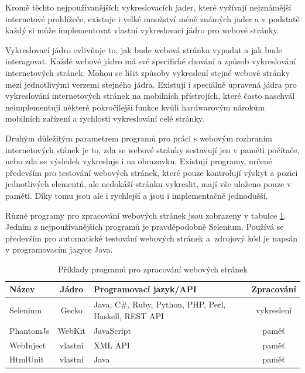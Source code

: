 \documentclass[thesis=M,czech]{FITthesis}[2013/05/10]
\begin{document}
Kromě těchto nejpoužívanějších vykreslovacích jader, které vyžívají nejznámější internetové prohlížeče, existuje i velké množství méně známých jader a v podstatě každý si může implementovat vlastní vykreslovací jádro pro webové stránky.

Vykreslovací jádro ovlivňuje to, jak bude webová stránka vypadat a jak bude interagovat. Každé webové jádro má své specifické chování a způsob vykreslování internetových stránek. Mohou se lišit způsoby vykreslení stejné webové stránky mezi jednotlivými verzemi stejného jádra. Existují i speciálně upravená jádra pro vykreslování internetových stránek na mobilních přístrojích, které často naschvál neimplementují některé pokročilejší funkce kvůli hardwarovým nárokům mobilních zařízení a rychlosti vykreslování celé stránky.

Druhým důležitým parametrem programů pro práci s webovým rozhraním internetových stánek je to, zda se webové stránky sestavují jen v paměti počítače, nebo zda se výsledek vykresluje i na obrazovku. Existují programy, určené především pro testování webových stránek, které pouze kontrolují výskyt a pozici jednotlivých elementů, ale nedokáží stránku vykreslit, mají vše uloženo pouze v paměti. Díky tomu jsou ale i rychlejší a jsou i implementačně jednodušší. 

Různé programy pro zpracování webových stránek jsou zobrazeny v tabulce \ref{tab:web-engines}. Jedním z nejpoužívanějších programů je pravděpodobně Selenium. Používá se především pro automatické testování webových stránek a~zdrojový kód je napsán v programovacím jazyce Java. 

\begin{table}[h]
\centering
\caption{Příklady programů pro zpracování webových stránek}\label{tab:web-engines}
\begin{tabular}{| l | c | p{5cm} | c |}
	\hline
	\textbf{Název} & 
	\textbf{Jádro} & 
	\textbf{Programovací jazyk/API} & 
	\textbf{Zpracování} \\ \hline
	
	Selenium & %
	Gecko & 
	Java, C\#, Ruby, Python, PHP, Perl, Haskell, REST API & 
	vykreslení \\ \hline
	
	PhantomJs & %
	WebKit & 
	JavaScript & 
	paměť \\ \hline
	
	WebInject & %
	vlastní &
	XML API &
	paměť \\ \hline
	
	HtmlUnit & %
	vlastní &
	Java &
	paměť \\ \hline
\end{tabular}
\end{table}
\end{document}
